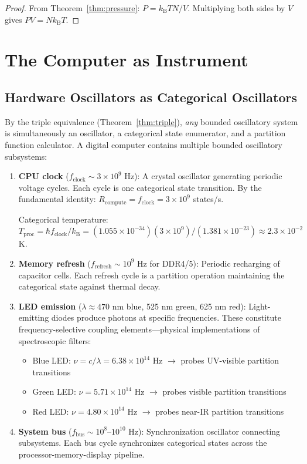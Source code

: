 \documentclass[11pt,twocolumn,a4paper]{article}
\theoremstyle{definition}
\theoremstyle{remark}
\newcommand{\kB}{k_{\mathrm{B}}}
\begin{document}
\begin{proof}
From Theorem~\ref{thm:pressure}: $P = \kB T N / V$. Multiplying both sides by $V$ gives $PV = N\kB T$.
\end{proof}

\section{The Computer as Instrument}
\label{sec:computer_instrument}

\subsection{Hardware Oscillators as Categorical Oscillators}

By the triple equivalence (Theorem~\ref{thm:triple}), \emph{any} bounded oscillatory system is simultaneously an oscillator, a categorical state enumerator, and a partition function calculator. A digital computer contains multiple bounded oscillatory subsystems:

\begin{enumerate}
\item \textbf{CPU clock} ($f_{\mathrm{clock}} \sim 3 \times 10^9$ Hz): A crystal oscillator generating periodic voltage cycles. Each cycle is one categorical state transition. By the fundamental identity: $R_{\mathrm{compute}} = f_{\mathrm{clock}} = 3 \times 10^9$ states/s.

Categorical temperature: $T_{\mathrm{proc}} = \hbar f_{\mathrm{clock}} / \kB = (1.055 \times 10^{-34})(3 \times 10^9)/(1.381 \times 10^{-23}) \approx 2.3 \times 10^{-2}$ K.

\item \textbf{Memory refresh} ($f_{\mathrm{refresh}} \sim 10^9$ Hz for DDR4/5): Periodic recharging of capacitor cells. Each refresh cycle is a partition operation maintaining the categorical state against thermal decay.

\item \textbf{LED emission} ($\lambda \approx 470$ nm blue, 525 nm green, 625 nm red): Light-emitting diodes produce photons at specific frequencies. These constitute frequency-selective coupling elements---physical implementations of spectroscopic filters:
\begin{itemize}[nosep]
\item Blue LED: $\nu = c/\lambda = 6.38 \times 10^{14}$ Hz $\to$ probes UV-visible partition transitions
\item Green LED: $\nu = 5.71 \times 10^{14}$ Hz $\to$ probes visible partition transitions
\item Red LED: $\nu = 4.80 \times 10^{14}$ Hz $\to$ probes near-IR partition transitions
\end{itemize}

\item \textbf{System bus} ($f_{\mathrm{bus}} \sim 10^8$--$10^{10}$ Hz): Synchronization oscillator connecting subsystems. Each bus cycle synchronizes categorical states across the processor-memory-display pipeline.
\end{enumerate}
\end{document}
